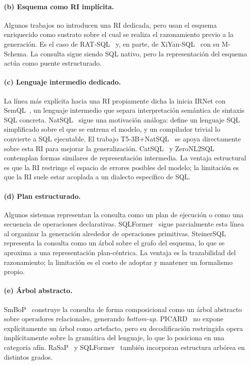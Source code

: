 \paragraph{(b) Esquema como RI implícita.} Algunos trabajos no introducen
una RI dedicada, pero usan el esquema enriquecido como sustrato sobre el
cual se realiza el razonamiento previo a la generación. Es el caso de
RAT-SQL~\cite{RAT-SQL2021} y, en parte, de XiYan-SQL~\cite{XiYan-SQL2024}
con su M-Schema. La consulta sigue siendo SQL nativo, pero la
representación del esquema actúa como puente estructurado.

\paragraph{(c) Lenguaje intermedio dedicado.} La línea más explícita
hacia una RI propiamente dicha la inicia IRNet con SemQL~\cite{IRNet}, un
lenguaje intermedio que separa interpretación semántica de sintaxis SQL
concreta. NatSQL~\cite{gan2021natsql} sigue una motivación análoga:
define un lenguaje SQL simplificado sobre el que se entrena el modelo, y
un compilador trivial lo convierte a SQL ejecutable. El trabajo
T5-3B+NatSQL~\cite{T5-3B+NatSQL+TokenPreprocessing2023} se apoya
directamente sobre esta \ac{RI} para mejorar la generalización. CatSQL~\cite{CatSQL2023} y ZeroNL2SQL~\cite{ZeroNL2SQL2024}
contemplan formas similares de representación intermedia. La ventaja
estructural es que la RI restringe el espacio de errores posibles del
modelo; la limitación es que la RI suele estar acoplada a un dialecto
específico de SQL.

\paragraph{(d) Plan estructurado.} Algunos sistemas representan la
consulta como un plan de ejecución o como una secuencia de operaciones
declarativas. SQLFormer~\cite{SQLFormer2023} sigue parcialmente esta
línea al organizar la generación alrededor de operaciones primitivas.
SteinerSQL~\cite{SteinerSQL2025} representa la consulta como un árbol
sobre el grafo del esquema, lo que se aproxima a una representación
plan-céntrica. La ventaja es la trazabilidad del razonamiento; la
limitación es el costo de adoptar y mantener un formalismo propio.

\paragraph{(e) Árbol abstracto.} SmBoP~\cite{SmBoP2021} construye la
consulta de forma composicional como un árbol abstracto sobre operadores
relacionales, generando \emph{bottom-up}. PICARD~\cite{PICARD2022} no
expone explícitamente un árbol como artefacto, pero su decodificación
restringida opera implícitamente sobre la gramática del lenguaje, lo
que lo posiciona en una categoría afín. RaSaP~\cite{RaSaP2021} y
SQLFormer~\cite{SQLFormer2023} también incorporan estructura arbórea en
distintos grados.

